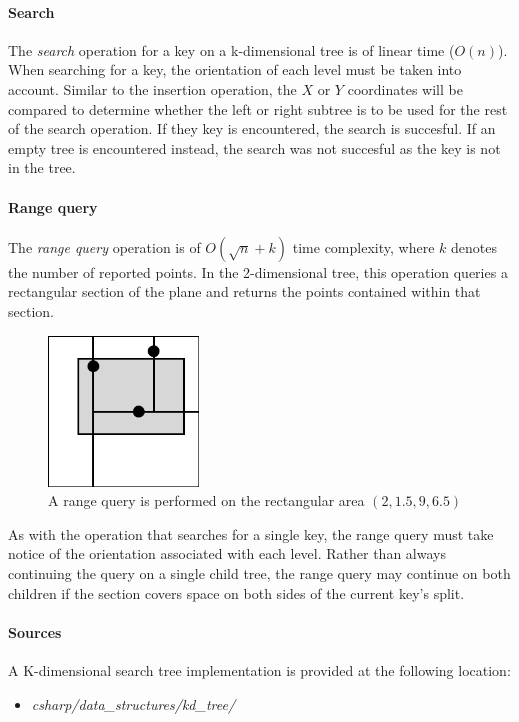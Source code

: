 \documentclass{article}
\begin{document}
\paragraph{Search}
The {\em search} operation for a key on a k-dimensional tree is of linear time (\(O(n)\)).
When searching for a key, the orientation of each level must be taken into account.
Similar to the insertion operation, the \(X\) or \(Y\) coordinates will be compared to determine
whether the left or right subtree is to be used for the rest of the search operation.
If they key is encountered, the search is succesful. If an empty tree is encountered instead,
the search was not succesful as the key is not in the tree.

\paragraph{Range query}
The {\em range query} operation is of \(O(\sqrt{n} + k)\) time complexity, where \(k\) denotes the number of
reported points. In the 2-dimensional tree, this operation queries a rectangular section of the plane and
returns the points contained within that section.

\begin{figure}[H]
  \centering
  \includegraphics[width=4cm]{2d_tree_3}
  \caption{A range query is performed on the rectangular area \((2, 1.5, 9, 6.5)\)}
\end{figure}

As with the operation that searches for a single key, the range query must take notice of the orientation
associated with each level. Rather than always continuing the query on a single child tree,
the range query may continue on both children if the section covers space on both sides of the current key's split.

\begin{samepage}
  \paragraph{Sources}
  A K-dimensional search tree implementation is provided at the following location:
  \begin{itemize}
  \item{{\em csharp/data\_structures/kd\_tree/}}
  \end{itemize}
\end{samepage}
\end{document}
